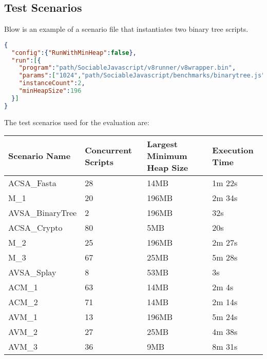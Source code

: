 \documentclass{l4proj}
\begin{document}
\begin{appendices}
\chapter{Test Scenarios}
\label{scenarioapx}
Blow is an example of a scenario file that instantiates two binary tree scripts.
\begin{lstlisting}[language=json,firstnumber=1]
{
  "config":{"RunWithMinHeap":false},
  "run":[{
    "program":"path/SociableJavascript/v8runner/v8wrapper.bin",
    "params":["1024","path/SociableJavascript/benchmarks/binarytree.js"],
    "instanceCount":2,
    "minHeapSize":196
  }]
}
\end{lstlisting}
The test scenarios used for the evaluation are:
\begin{center}
\begin{tabular}{|l|l|l|l|}
\hline
Scenario Name & Concurrent Scripts & Largest Minimum Heap Size & Execution Time\\
\hline
ACSA\_Fasta & 28 & 14MB & 1m 22s\\
\hline
M\_1 & 20 & 196MB & 2m 34s\\
\hline
AVSA\_BinaryTree & 2 & 196MB & 32s\\
\hline
ACSA\_Crypto & 80 & 5MB & 20s\\
\hline
M\_2 & 25 & 196MB & 2m 27s\\
\hline
M\_3 & 67 & 25MB & 5m 28s\\
\hline
AVSA\_Splay & 8 & 53MB & 3s\\
\hline
ACM\_1 & 63  & 14MB & 2m 4s\\
\hline
ACM\_2 & 71  & 14MB & 2m 14s\\
\hline
AVM\_1 & 13  & 196MB & 5m 24s\\
\hline
AVM\_2 & 27  & 25MB & 4m 38s\\
\hline
AVM\_3 & 36 & 9MB & 8m 31s\\
\hline
\end{tabular}
\end{center}

\end{appendices}
\end{document}
